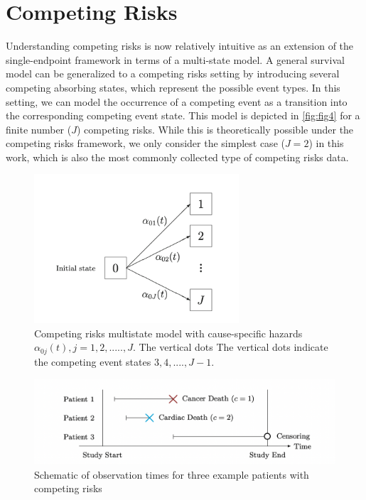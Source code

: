 \section{Competing Risks}

Understanding competing risks is now relatively intuitive as an extension of  the single-endpoint framework in terms of a multi-state model. A general survival model can be generalized to a competing risks setting by introducing several competing absorbing states, which represent the possible event types. In this setting, we can model the occurrence of a competing event as a transition into the corresponding competing event state. This model is depicted in \autoref{fig:fig4} for a finite number ($J$) competing risks. While this is theoretically possible under the competing risks framework, we only consider the simplest case ($J = 2$) in this work, which is also the most commonly collected type of competing risks data.


\begin{figure}[h]
    \centering
    \includegraphics[width=3in]{competing_risks.png}
    \caption{Competing risks multistate model with cause-specific hazards $\alpha_{0j}(t), j = 1, 2, ....., J$. The vertical dots The vertical dots indicate the competing event states 
    $3, 4, ...., J-1$.}
    \label{fig:fig4}   %
    \end{figure}

\begin{figure}[h]
    \centering
    \includegraphics[width=6in]{competingrisks_example.png}
    \caption{Schematic of observation times for three example patients with competing risks}
    \label{fig:fig6}   %
    \end{figure}

